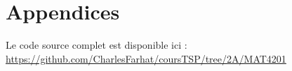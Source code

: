 \section{Appendices}
\label{chap:appendices}
\label{code_source}
Le code source complet est disponible ici : \url{https://github.com/CharlesFarhat/coursTSP/tree/2A/MAT4201}

